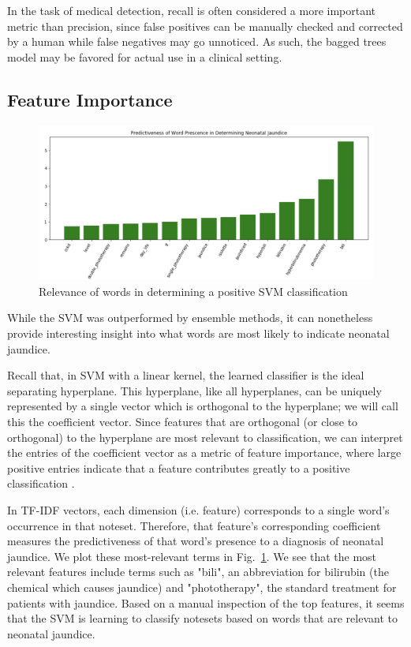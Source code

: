 \documentclass[conference]{IEEEtran}
\begin{document}
In the task of medical detection, recall is often considered a more important metric than precision, since false positives can be manually checked and corrected by a human while false negatives may go unnoticed. As such, the bagged trees model may be favored for actual use in a clinical setting.
\subsection{Feature Importance}
\begin{figure}[htbp]
\centerline{\includegraphics[scale=0.5]{predictiveness}}
\caption{Relevance of words in determining a positive SVM classification}
\label{rel}
\end{figure}
While the SVM was outperformed by ensemble methods, it can nonetheless provide interesting insight into what words are most likely to indicate neonatal jaundice.

Recall that, in SVM with a linear kernel, the learned classifier is the ideal separating hyperplane. This hyperplane, like all hyperplanes, can be uniquely represented by a single vector which is orthogonal to the hyperplane; we will call this the coefficient vector. Since features that are orthogonal (or close to orthogonal) to the hyperplane are most relevant to classification, we can interpret the entries of the coefficient vector as a metric of feature importance, where large positive entries indicate that a feature contributes greatly to a positive classification \cite{Guyon}.

In TF-IDF vectors, each dimension (i.e. feature) corresponds to a single word's occurrence in that noteset. Therefore, that feature's corresponding coefficient measures the predictiveness of that word's presence to a diagnosis of neonatal jaundice. We plot these most-relevant terms in Fig.~\ref{rel}.
We see that the most relevant features include terms such as "bili", an abbreviation for bilirubin (the chemical which causes jaundice) and "phototherapy", the standard treatment for patients with jaundice. Based on a manual inspection of the top features, it seems that the SVM is learning to classify notesets based on words that are relevant to neonatal jaundice. 
\end{document}
